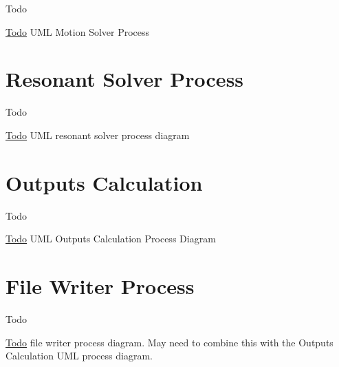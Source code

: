 \begin{DoxyRefDesc}{Todo}
\item[\hyperlink{todo__todo000003}{Todo}]U\-M\-L Motion Solver Process\end{DoxyRefDesc}
\hypertarget{uml_resonantsolver}{}\section{Resonant Solver Process}\label{uml_resonantsolver}
\begin{DoxyRefDesc}{Todo}
\item[\hyperlink{todo__todo000006}{Todo}]U\-M\-L resonant solver process diagram\end{DoxyRefDesc}
\hypertarget{uml_outputscalculation}{}\section{Outputs Calculation}\label{uml_outputscalculation}
\begin{DoxyRefDesc}{Todo}
\item[\hyperlink{todo__todo000004}{Todo}]U\-M\-L Outputs Calculation Process Diagram\end{DoxyRefDesc}
\hypertarget{uml_writingfiles}{}\section{File Writer Process}\label{uml_writingfiles}
\begin{DoxyRefDesc}{Todo}
\item[\hyperlink{todo__todo000008}{Todo}]file writer process diagram. May need to combine this with the Outputs Calculation U\-M\-L process diagram.\end{DoxyRefDesc}
